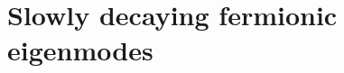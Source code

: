 \chapter{Slowly decaying fermionic eigenmodes\label{chap:currents}}
\thispagestyle{chapterBeginStyle}

